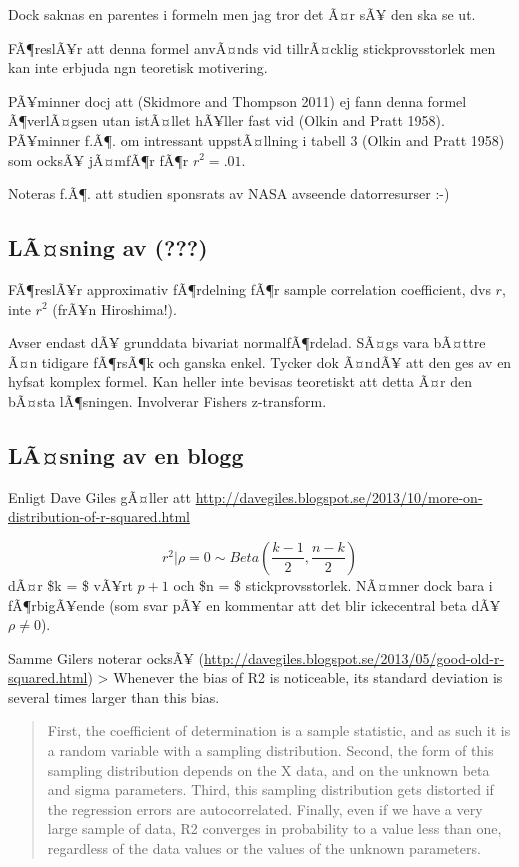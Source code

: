 \documentclass[]{article}
\begin{document}
Dock saknas en parentes i formeln men jag tror det Ã¤r sÃ¥ den ska se
ut.

FÃ¶reslÃ¥r att denna formel anvÃ¤nds vid tillrÃ¤cklig stickprovsstorlek
men kan inte erbjuda ngn teoretisk motivering.

PÃ¥minner docj att (Skidmore and Thompson 2011) ej fann denna formel
Ã¶verlÃ¤gsen utan istÃ¤llet hÃ¥ller fast vid (Olkin and Pratt 1958).
PÃ¥minner f.Ã¶. om intressant uppstÃ¤llning i tabell 3 (Olkin and Pratt
1958) som ocksÃ¥ jÃ¤mfÃ¶r fÃ¶r \(r^2=.01\).

Noteras f.Ã¶. att studien sponsrats av NASA avseende datorresurser :-)

\subsection{\texorpdfstring{LÃ¤sning av
({\textbf{???}})}{LÃ¤sning av (???)}}\label{lasning-av-konisho1978}

FÃ¶reslÃ¥r approximativ fÃ¶rdelning fÃ¶r sample correlation coefficient,
dvs \(r\), inte \(r^2\) (frÃ¥n Hiroshima!).

Avser endast dÃ¥ grunddata bivariat normalfÃ¶rdelad. SÃ¤gs vara bÃ¤ttre
Ã¤n tidigare fÃ¶rsÃ¶k och ganska enkel. Tycker dok Ã¤ndÃ¥ att den ges av
en hyfsat komplex formel. Kan heller inte bevisas teoretiskt att detta
Ã¤r den bÃ¤sta lÃ¶sningen. Involverar Fishers z-transform.

\subsection{LÃ¤sning av en blogg}\label{lasning-av-en-blogg}

Enligt Dave Giles gÃ¤ller att
\url{http://davegiles.blogspot.se/2013/10/more-on-distribution-of-r-squared.html}

\[r^2|\rho = 0 \sim Beta(\frac{k-1}{2}, \frac{n-k}{2})\] dÃ¤r \$k = \$
vÃ¥rt \(p+1\) och \$n = \$ stickprovsstorlek. NÃ¤mner dock bara i
fÃ¶rbigÃ¥ende (som svar pÃ¥ en kommentar att det blir ickecentral beta
dÃ¥ \(\rho \neq 0\)).

Samme Gilers noterar ocksÃ¥
(\url{http://davegiles.blogspot.se/2013/05/good-old-r-squared.html})
\textgreater{} Whenever the bias of R2 is noticeable, its standard
deviation is several times larger than this bias.

\begin{quote}
First, the coefficient of determination is a sample statistic, and as
such it is a random variable with a sampling distribution. Second, the
form of this sampling distribution depends on the X data, and on the
unknown beta and sigma parameters. Third, this sampling distribution
gets distorted if the regression errors are autocorrelated. Finally,
even if we have a very large sample of data, R2 converges in probability
to a value less than one, regardless of the data values or the values of
the unknown parameters.
\end{quote}
\end{document}
